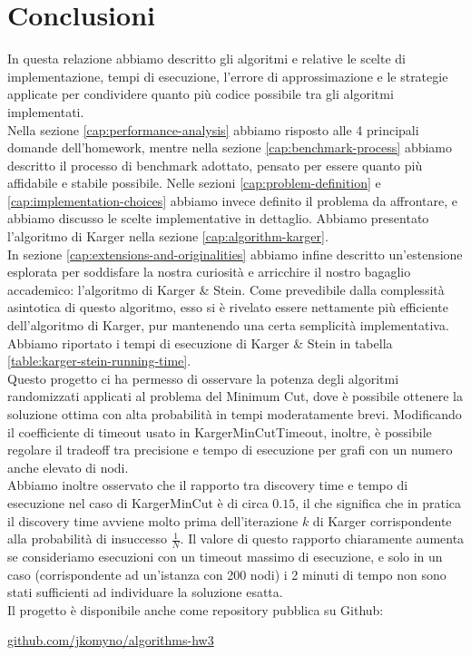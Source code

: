 \section{Conclusioni}
\label{cap:conclusions}

\noindent In questa relazione abbiamo descritto gli algoritmi e relative le scelte di implementazione, tempi
di esecuzione, l’errore di approssimazione e le strategie applicate per condividere quanto più codice possibile tra gli algoritmi implementati. \\

\noindent Nella sezione \ref{cap:performance-analysis} abbiamo risposto alle 4 principali domande dell’homework, mentre nella sezione
\ref{cap:benchmark-process} abbiamo descritto il processo di benchmark adottato, pensato per essere quanto più affidabile e
stabile possibile. Nelle sezioni \ref{cap:problem-definition} e \ref{cap:implementation-choices}
abbiamo invece definito il problema da affrontare, e abbiamo discusso le scelte implementative in dettaglio. Abbiamo presentato l'algoritmo di Karger nella sezione \ref{cap:algorithm-karger}. \\

\noindent In sezione \ref{cap:extensions-and-originalities} abbiamo infine descritto un'estensione esplorata per soddisfare la nostra curiosità e arricchire il nostro bagaglio accademico: l'algoritmo di Karger \& Stein. Come prevedibile dalla complessità asintotica di questo algoritmo, esso si è rivelato essere nettamente più efficiente dell'algoritmo di Karger, pur mantenendo una certa semplicità implementativa. Abbiamo riportato i tempi di esecuzione di Karger \& Stein in tabella \ref{table:karger-stein-running-time}. \\

\noindent Questo progetto ci ha permesso di osservare la potenza degli algoritmi randomizzati applicati al problema del Minimum Cut, dove è possibile ottenere la soluzione ottima con alta probabilità in tempi moderatamente brevi. Modificando il coefficiente di timeout usato in KargerMinCutTimeout, inoltre, è possibile regolare il tradeoff tra precisione e tempo di esecuzione per grafi con un numero anche elevato di nodi. \\

\noindent Abbiamo inoltre osservato che il rapporto tra discovery time e tempo di esecuzione nel caso di KargerMinCut è di circa $0.15$, il che significa che in pratica il discovery time avviene molto prima dell'iterazione $k$ di Karger corrispondente alla probabilità di insuccesso $\frac{1}{N}$. Il valore di questo rapporto chiaramente aumenta se consideriamo esecuzioni con un timeout massimo di esecuzione, e solo in un caso (corrispondente ad un'istanza con 200 nodi) i 2 minuti di tempo non sono stati sufficienti ad individuare la soluzione esatta. \\

\noindent Il progetto è disponibile anche come repository pubblica su Github:

\begin{center}
\href{https://github.com/jkomyno/algorithms-hw3}{github.com/jkomyno/algorithms-hw3}
\end{center}
